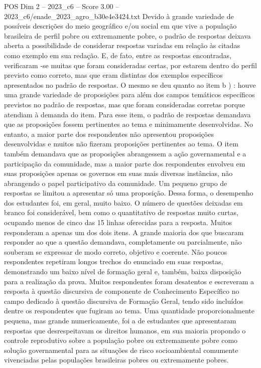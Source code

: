 \begin{textsample}{POS Dim 2 – 2023\_c6 – Score 3.00 – 2023\_c6/enade\_2023\_agro\_b30e4e3424.txt}
Devido à grande variedade de possíveis descrições do meio geográfico e/ou social em que vive a população brasileira de perfil pobre ou extremamente pobre, o padrão de respostas deixava aberta a possibilidade de considerar respostas variadas em relação às citadas como exemplo em sua redação.
E, de fato, entre as respostas encontradas, verificaram -se muitas que foram consideradas certas, por estarem dentro do perfil previsto como correto, mas que eram distintas dos exemplos específicos apresentados no padrão de respostas.
O mesmo se deu quanto ao item b ) : houve uma grande variedade de proposições para além dos campos temáticos específicos previstos no padrão de respostas, mas que foram consideradas corretas porque atendiam à demanda do item.
Para esse item, o padrão de respostas demandava que as proposições fossem pertinentes ao tema e minimamente desenvolvidas.
No entanto, a maior parte dos respondentes não apresentou proposições desenvolvidas e muitos não fizeram proposições pertinentes ao tema.
O item também demandava que as proposições abrangessem a ação governamental e a participação da comunidade, mas a maior parte dos respondentes envolveu em suas proposições apenas os governos em suas mais diversas instâncias, não abrangendo o papel participativo da comunidade.
Um pequeno grupo de respostas se limitou a apresentar só uma proposição.
Dessa forma, o desempenho dos estudantes foi, em geral, muito baixo.
O número de questões deixadas em branco foi considerável, bem como o quantitativo de respostas muito curtas, ocupando menos de cinco das 15 linhas oferecidas para a resposta.
Muitos responderam a apenas um dos dois itens.
A grande maioria dos que buscaram responder ao que a questão demandava, completamente ou parcialmente, não souberam se expressar de modo correto, objetivo e coerente.
Não poucos respondentes repetiram longos trechos do enunciado em suas respostas, demonstrando um baixo nível de formação geral e, também, baixa disposição para a realização da prova.
Muitos respondentes foram desatentos e escreveram a resposta à questão discursiva de componente de Conhecimento Específico no campo dedicado à questão discursiva de Formação Geral, tendo sido incluídos dentre os respondentes que fugiram ao tema.
Uma quantidade proporcionalmente pequena, mas grande numericamente, foi a de estudantes que apresentaram respostas que desrespeitavam os direitos humanos, em sua maioria propondo o controle reprodutivo sobre a população pobre ou extremamente pobre como solução governamental para as situações de risco socioambiental comumente vivenciadas pelas populações brasileiras pobres ou extremamente pobres.

\end{textsample}
